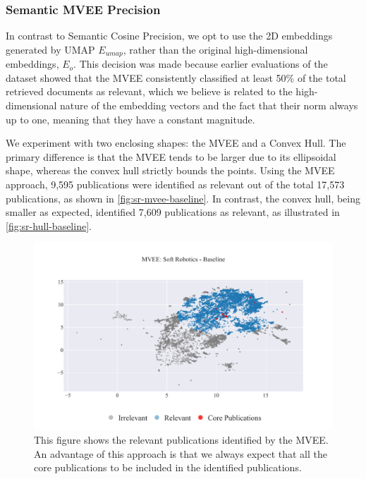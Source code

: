 \subsubsection{Semantic MVEE Precision}

In contrast to Semantic Cosine Precision, we opt to use the 2D embeddings generated by UMAP $E_{umap}$, rather than the original high-dimensional embeddings, $E_o$. This decision was made because earlier evaluations of the dataset showed that the MVEE consistently classified at least 50\% of the total retrieved documents as relevant, which we believe is related to the high-dimensional nature of the embedding vectors and the fact that their norm always up to one, meaning that they have a constant magnitude.

We experiment with two enclosing shapes: the MVEE and a Convex Hull. The primary difference is that the MVEE tends to be larger due to its ellipsoidal shape, whereas the convex hull strictly bounds the points. Using the MVEE approach, 9,595 publications were identified as relevant out of the total 17,573 publications, as shown in \autoref{fig:sr-mvee-baseline}. In contrast, the convex hull, being smaller as expected, identified 7,609 publications as relevant, as illustrated in \autoref{fig:sr-hull-baseline}.

\begin{figure}
	\centering	
	\includegraphics[scale=0.6]{pics/sr-mvee-baseline.pdf}
	\caption[Semantic MVEE: Soft Robotics]{This figure shows the relevant publications identified by the MVEE. An advantage of this approach is that we always expect that all the core publications to be included in the identified publications.}\label{fig:sr-mvee-baseline}
\end{figure}

